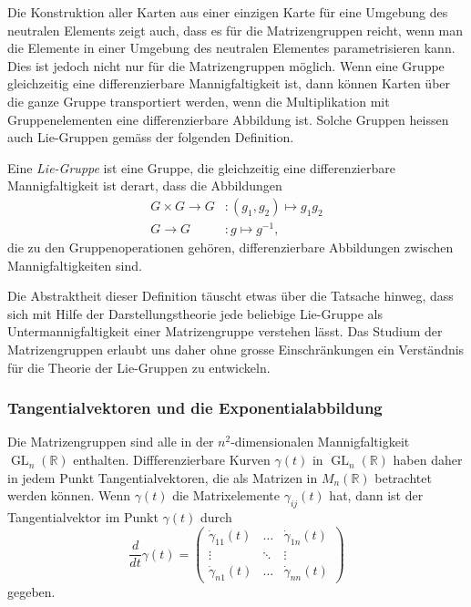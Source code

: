 Die Konstruktion aller Karten aus einer einzigen Karte für eine
Umgebung des neutralen Elements zeigt auch, dass es für die Matrizengruppen
reicht, wenn man die Elemente in einer Umgebung des neutralen
Elementes parametrisieren kann.
Dies ist jedoch nicht nur für die Matrizengruppen möglich.
Wenn eine Gruppe gleichzeitig eine differenzierbare Mannigfaltigkeit
ist, dann können Karten über die ganze Gruppe transportiert werden,
wenn die Multiplikation mit Gruppenelementen eine differenzierbare
Abbildung ist.
Solche Gruppen heissen auch Lie-Gruppen gemäss der folgenden Definition.

\begin{definition}
%
Eine {\em Lie-Gruppe} ist eine Gruppe, die gleichzeitig eine differenzierbare
Mannigfaltigkeit ist derart, dass die Abbildungen
\begin{align*}
G\times G \to G &: (g_1,g_2)\mapsto g_1g_2
\\
G\to G &: g \mapsto g^{-1},
\end{align*}
die zu den Gruppenoperationen gehören,
differenzierbare Abbildungen zwischen Mannigfaltigkeiten sind.
\end{definition}

Die Abstraktheit dieser Definition täuscht etwas über die 
Tatsache hinweg, dass sich mit Hilfe der Darstellungstheorie
jede beliebige Lie-Gruppe als Untermannigfaltigkeit einer 
Matrizengruppe verstehen lässt.
Das Studium der Matrizengruppen erlaubt uns daher ohne grosse
Einschränkungen ein Verständnis für die Theorie der Lie-Gruppen
zu entwickeln.

\subsubsection{Tangentialvektoren und die Exponentialabbildung}
Die Matrizengruppen sind alle in der
$n^2$-dimensionalen Mannigfaltigkeit $\operatorname{GL}_n(\mathbb{R})$
enthalten.
Diffferenzierbare Kurven $\gamma(t)$ in $\operatorname{GL}_n(\mathbb{R})$
haben daher in jedem Punkt Tangentialvektoren, die als Matrizen in
$M_n(\mathbb{R})$ betrachtet werden können.
Wenn $\gamma(t)$ die Matrixelemente $\gamma_{i\!j}(t)$ hat, dann ist der
Tangentialvektor im Punkt $\gamma(t)$ durch
\[
\frac{d}{dt}
\gamma(t)
=
\begin{pmatrix}
\dot{\gamma}_{11}(t)&\dots &\dot{\gamma}_{1n}(t)\\
\vdots              &\ddots&\vdots              \\
\dot{\gamma}_{n1}(t)&\dots &\dot{\gamma}_{nn}(t)
\end{pmatrix}
\]
gegeben.

